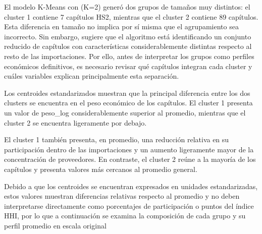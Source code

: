 \documentclass[
]{article}
\begin{document}
El modelo K-Means con (K=2) generó dos grupos de tamaños muy distintos:
el cluster 1 contiene 7 capítulos HS2, mientras que el cluster 2
contiene 89 capítulos. Esta diferencia en tamaño no implica por sí misma
que el agrupamiento sea incorrecto. Sin embargo, sugiere que el
algoritmo está identificando un conjunto reducido de capítulos con
características considerablemente distintas respecto al resto de las
importaciones. Por ello, antes de interpretar los grupos como perfiles
económicos definitivos, es necesario revisar qué capítulos integran cada
cluster y cuáles variables explican principalmente esta separación.

Los centroides estandarizados muestran que la principal diferencia entre
los dos clusters se encuentra en el peso económico de los capítulos. El
cluster 1 presenta un valor de peso\_log considerablemente superior al
promedio, mientras que el cluster 2 se encuentra ligeramente por debajo.

El cluster 1 también presenta, en promedio, una reducción relativa en su
participación dentro de las importaciones y un aumento ligeramente mayor
de la concentración de proveedores. En contraste, el cluster 2 reúne a
la mayoría de los capítulos y presenta valores más cercanos al promedio
general.

Debido a que los centroides se encuentran expresados en unidades
estandarizadas, estos valores muestran diferencias relativas respecto al
promedio y no deben interpretarse directamente como porcentajes de
participación o puntos del índice HHI, por lo que a continuación se
examina la composición de cada grupo y su perfil promedio en escala
original
\end{document}
